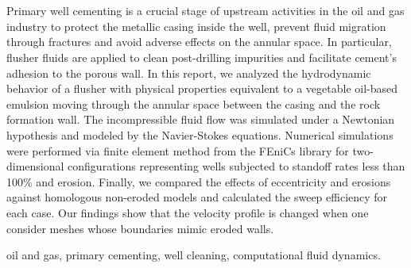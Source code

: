 \newpage
\section*{} 

\noindent 
Primary well cementing is a crucial stage of upstream activities in the oil and gas industry to protect the metallic casing inside the well, prevent fluid migration through fractures and avoid adverse effects on the annular space. In particular, flusher fluids are applied to clean post-drilling impurities and facilitate cement's adhesion to the porous wall. In this report, we analyzed the hydrodynamic behavior of a flusher with physical properties equivalent to a vegetable oil-based emulsion moving through the annular space between the casing and the rock formation wall. The incompressible fluid flow was simulated under a Newtonian hypothesis and modeled by the Navier-Stokes equations. Numerical simulations were performed via finite element method from the FEniCs library for two-dimensional configurations representing wells subjected to standoff rates less than 100\% and erosion. Finally, we compared the effects of eccentricity and erosions against homologous non-eroded models and calculated the sweep efficiency for each case. Our findings show that the velocity profile is changed when one consider meshes whose boundaries mimic eroded walls.

\vspace{1cm}

oil and gas,
primary cementing, 
well cleaning, 
computational fluid dynamics.
